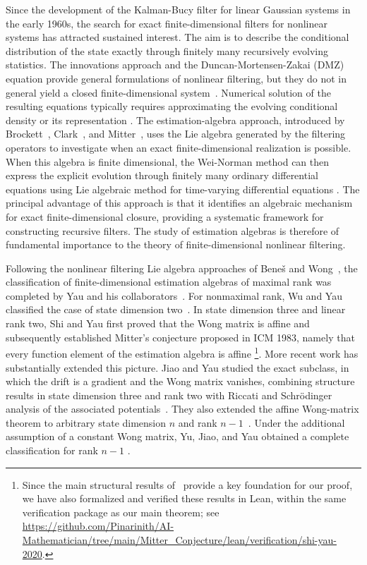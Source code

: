 \documentclass{tCON2e}
\newenvironment{revision}{\begingroup\color{black}}{\endgroup}
\numberwithin{equation}{section}
\theoremstyle{journalplain}
\theoremstyle{journaldef}
\newenvironment{revision}{}{}
\begin{document}
\begin{revision}
Since the development of the Kalman-Bucy filter for linear Gaussian
systems in the early 1960s, the search for exact finite-dimensional
filters for nonlinear systems has attracted sustained interest.
The aim is to describe the conditional distribution of the state
exactly through finitely many recursively evolving statistics.
The innovations approach and the Duncan-Mortensen-Zakai (DMZ)
equation provide general formulations of nonlinear filtering,
but they do not in general yield a closed finite-dimensional
system~\citep{Fujisaki1972Stochastic,Marcus1984Algebraic}.
Numerical solution of the resulting equations typically requires
approximating the evolving conditional density or its representation
\citep{Luo2013Complete}.
The estimation-algebra approach, introduced by Brockett~\citep{Brockett1980The}, Clark~\citep{Brockett1981Nonlinear},
and Mitter~\citep{Mitter1979On},
uses the Lie algebra generated by the filtering operators to
investigate when an exact finite-dimensional realization is possible.
When this algebra is finite dimensional,
the Wei-Norman method can then express the explicit evolution
through finitely many ordinary differential equations using Lie algebraic method for time-varying differential equations
\citep{Wei1964On,Marcus1984Algebraic}.
The principal advantage of this approach is that it identifies
an algebraic mechanism for exact finite-dimensional closure,
providing a systematic framework for constructing recursive
filters. The study of estimation algebras is therefore of fundamental importance
to the theory of finite-dimensional nonlinear filtering.

Following the nonlinear filtering Lie algebra approaches of Bene\v{s} and Wong~\citep{Benes1981Exact,Wong1983New}, the classification of finite-dimensional
estimation algebras of maximal rank was completed by Yau and his
collaborators~\citep{Yau2003Complete,Yau2005Classification}.
For nonmaximal rank, Wu and Yau classified
the case of state dimension two~\citep{Wu2006Classification}. In state dimension three and linear
rank two, Shi and Yau first proved that the Wong matrix is affine
\citep{Shi2017Finite} and subsequently established Mitter's conjecture proposed in ICM 1983,
namely that every function element of the estimation algebra is affine
\citep{Shi2020Finite}\footnote{Since the main structural results of~\citep{Shi2020Finite}
provide a key foundation for our proof, we have also formalized
and verified these results in Lean, within the same verification
package as our main theorem; see
\url{https://github.com/Pinarinith/AI-Mathematician/tree/main/Mitter_Conjecture/lean/verification/shi-yau-2020}.}. More recent work has substantially extended this
picture. Jiao and Yau studied the exact subclass, in which the drift is
a gradient and the Wong matrix vanishes, combining structure results
in state dimension three and rank two with Riccati and Schr\"odinger
analysis of the associated potentials~\citep{Jiao2023Structure}.
They also extended the affine Wong-matrix theorem to arbitrary state
dimension $n$ and rank $n-1$~\citep{Jiao2024FiniteDimensional}.
Under the additional assumption of a constant Wong matrix, Yu, Jiao,
and Yau obtained a complete classification for rank $n-1$
\citep{Yu2024Complete}.


\end{revision}
\end{document}
